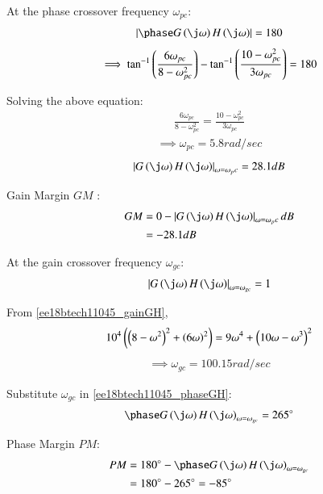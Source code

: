 At the phase crossover frequency $\omega_{pc}$:
\begin{align}
    \abs{\phase G\brak{\j\omega}H\brak{\j\omega}} = 180
\end{align}
\begin{align}
    \implies \tan^{-1}\left(\frac{6\omega_{pc}}{8 - \omega_{pc}^2}\right) - \tan^{-1}\left(\frac{10-\omega_{pc}^2}{3\omega_{pc}}\right) = 180
\end{align}

Solving the above equation:
\begin{align}
    \frac{6\omega_{pc}}{8 - \omega_{pc}^2} = \frac{10-\omega_{pc}^2}{3\omega_{pc}}
\end{align}
\begin{align}
    \implies \omega_{pc} = 5.8 rad/sec
\end{align}
\begin{align}
    \abs{G\brak{\j\omega}H\brak{\j\omega}}_{\omega=\omega_pc} = 28.1 dB
\end{align}

Gain Margin {$GM$} :
\begin{align}
    GM &= 0 - \abs{G\brak{\j\omega}H\brak{\j\omega}}_{\omega=\omega_pc} dB
    \\&= -28.1 dB
\end{align}


%

At the gain crossover frequency $\omega_{gc}$:
\begin{align}
    \abs{G\brak{\j\omega}H\brak{\j\omega}}_{\omega=\omega_{gc}} = 1
\end{align}

From \eqref{ee18btech11045_gainGH},
\begin{align}
    10^4\left(\left(8-\omega^2\right)^2 + \left(6\omega\right)^2\right) = 9\omega^4 + \left(10\omega - \omega^3\right)^2
\end{align}
\begin{align}
    \implies \omega_{gc} = 100.15 rad/sec
\end{align}

Substitute $\omega_{gc}$ in \eqref{ee18btech11045_phaseGH}:
\begin{align}
    \phase G\brak{\j\omega}H\brak{\j\omega}_{\omega = \omega_{gc}} = 265\degree
\end{align}

Phase Margin {$PM$}:
\begin{align}
    PM &= 180\degree - \phase G\brak{\j\omega}H\brak{\j\omega}_{\omega = \omega_{gc}}
    \\
    &= 180\degree - 265\degree = - 85\degree
\end{align}


